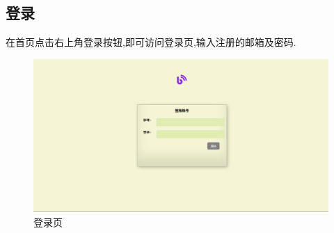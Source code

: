 \subsection{登录}
在首页点击右上角登录按钮,即可访问登录页,输入注册的邮箱及密码.

\begin{figure}[thbp!]
	\centering
	\includegraphics[scale=0.35]{figure/login}
	\caption{登录页}
\end{figure}

